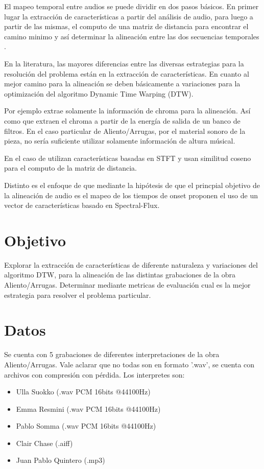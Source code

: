 \documentclass{article}
\begin{document}
El mapeo temporal entre audios se puede dividir en dos pasos básicos. En primer lugar la extracción de características a partir del análisis de audio, para luego a partir de las mismas, el computo de una matriz de distancia para encontrar el camino minimo y así determinar la alineación entre las dos secuencias temporales \cite[Chapter~7]{Lerch:2012:IAC:2392638}.
\medskip

En la literatura, las mayores diferencias entre las diversas estrategias para la resolución del problema están en la extracción de características. En cuanto al mejor camino para la alineación se deben básicamente a variaciones para la optimización del algoritmo Dynamic Time Warping (DTW).
\medskip

Por ejemplo \cite{hu2003polyphonic}	extrae solamente la información de chroma para la alineación. Así como \citep{muller2006efficient} que extraen el chroma a partir de la energía de salida de un banco de filtros. En el caso particular de Aliento/Arrugas, por el material sonoro de la pieza, no sería suficiente utilizar solamente información de altura músical.
\medskip

En el caso de \cite{turetsky2003ground} utilizan características basadas en STFT y usan similitud coseno para el computo de la matriz de distancia.
\medskip

Distinto es el enfoque de \cite{dixon2005match} que mediante la hipótesis de que el princpial objetivo de la alineación de audio es el mapeo de los tiempos de onset proponen el uso de un vector de características basado en Spectral-Flux.

\section*{Objetivo}
Explorar la extracción de características de diferente naturaleza y variaciones del algoritmo DTW, para la alineación de las distintas grabaciones de la obra Aliento/Arrugas. Determinar mediante metricas de evaluación cual es la mejor estrategia para resolver el problema particular.


\section*{Datos}
Se cuenta con 5 grabaciones de diferentes interpretaciones de la obra Aliento/Arrugas. Vale aclarar que no todas son en formato '.wav', se cuenta con archivos con compresión con pérdida. Los interpretes son: 

\begin{itemize} 
  \item Ulla Suokko (.wav PCM 16bits @44100Hz)
  \item Emma Resmini (.wav PCM 16bits @44100Hz)
  \item Pablo Somma (.wav PCM 16bits @44100Hz)
  \item Clair Chase (.aiff)
  \item Juan Pablo Quintero (.mp3)
\end{itemize}
\end{document}
